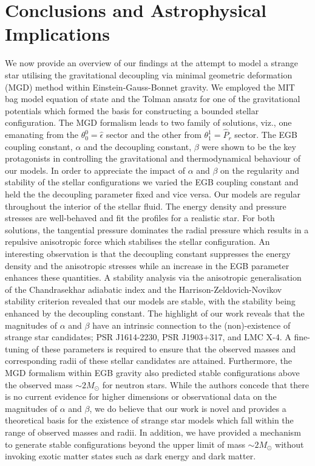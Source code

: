\documentclass[]{aastex631}
\begin{document}
\section{Conclusions and Astrophysical Implications} \label{sec6}
We now provide an overview of our findings at the attempt to model a strange star utilising the gravitational decoupling via minimal geometric deformation (MGD) method within Einstein-Gauss-Bonnet gravity. We employed the MIT bag model equation of state and the Tolman ansatz for one of the gravitational potentials which formed the basis for constructing a bounded stellar configuration. The MGD formalism leads to two family of solutions, viz., one emanating from the $\theta_0^0=\hat{\epsilon}$ sector and the other from $\theta_1^1=\hat{P}_r$ sector. The EGB coupling constant, $\alpha$ and the decoupling constant, $\beta$ were shown to be the key protagonists in controlling the gravitational and thermodynamical behaviour of our models. In order to appreciate the impact of $\alpha$ and $\beta$ on the regularity and stability  of the stellar configurations we varied the EGB coupling constant and held the the decoupling parameter fixed and vice versa. Our models are regular throughout the interior of the stellar fluid. The energy density and pressure stresses are well-behaved and fit the profiles for a realistic star. For both solutions, the tangential pressure dominates the radial pressure which results in a repulsive anisotropic force which stabilises the stellar configuration. An interesting observation is that the decoupling constant suppresses the energy density and the anisotropic stresses while an increase in the EGB parameter enhances these quantities. A stability analysis via the anisotropic generalisation of the Chandrasekhar adiabatic index and the Harrison-Zeldovich-Novikov stability criterion revealed that our models are stable, with the stability being enhanced by the decoupling constant. The highlight of our work reveals that the magnitudes of $\alpha$ and $\beta$ have an intrinsic connection to the (non)-existence of strange star candidates; PSR J1614-2230, PSR J1903+317, and LMC X-4. A fine-tuning of these parameters is required to ensure that the observed masses and corresponding radii of these stellar candidates are attained. Furthermore, the MGD formalism within EGB gravity also predicted stable configurations above the observed mass $\sim 2 M_{\odot}$ for neutron stars. While the authors concede that there is no current evidence for higher dimensions or observational data on the magnitudes of $\alpha$ and $\beta$, we do believe that our work is novel and provides a theoretical basis for the existence of strange star models which fall within the range of observed masses and radii. In addition, we have provided a mechanism to generate stable configurations beyond the upper limit of mass $\sim 2 M_{\odot}$ without invoking exotic matter states such as dark energy and dark matter.
\end{document}
